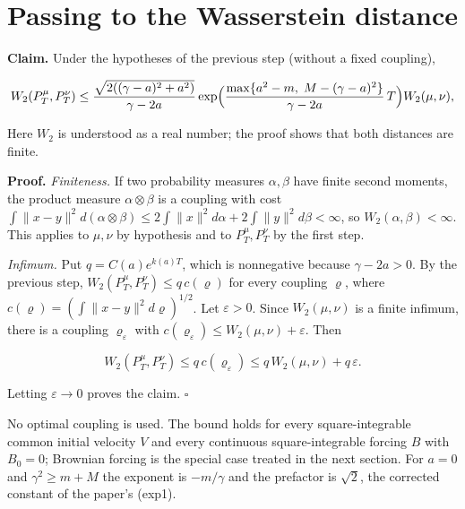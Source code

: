 \documentclass[11pt,a4paper]{article}
\begin{document}
\section{\texorpdfstring{Passing to the Wasserstein distance}{Passing to the Wasserstein distance}}


\textbf{Claim.} Under the hypotheses of the previous step (without a fixed coupling),


\[W_2(P^\mu_T,P^\nu_T)\le\frac{\sqrt{2((\gamma-a)^2+a^2)}}{\gamma-2a}\exp\Bigl(\frac{\max\{a^2-m,\;M-(\gamma-a)^2\}}{\gamma-2a}\,T\Bigr)W_2(\mu,\nu),\]


Here \(W_2\) is understood as a real number; the proof shows that both distances are finite.




\textbf{Proof.} \emph{Finiteness.} If two probability measures \(\alpha,\beta\) have finite second moments, the product measure \(\alpha\otimes\beta\) is a coupling with cost \(\int\|x-y\|^2d(\alpha\otimes\beta)\le2\int\|x\|^2d\alpha+2\int\|y\|^2d\beta<\infty\), so \(W_2(\alpha,\beta)<\infty\). This applies to \(\mu,\nu\) by hypothesis and to \(P^\mu_T,P^\nu_T\) by the first step.




\emph{Infimum.} Put \(q=C(a)e^{k(a)T}\), which is nonnegative because \(\gamma-2a>0\). By the previous step, \(W_2(P^\mu_T,P^\nu_T)\le q\,c(\varrho)\) for every coupling \(\varrho\), where \(c(\varrho)=(\int\|x-y\|^2d\varrho)^{1/2}\). Let \(\varepsilon>0\). Since \(W_2(\mu,\nu)\) is a finite infimum, there is a coupling \(\varrho_\varepsilon\) with \(c(\varrho_\varepsilon)\le W_2(\mu,\nu)+\varepsilon\). Then


\[W_2(P^\mu_T,P^\nu_T)\le q\,c(\varrho_\varepsilon)\le q\,W_2(\mu,\nu)+q\,\varepsilon.\]


Letting \(\varepsilon\to0\) proves the claim. \(\square\)




No optimal coupling is used. The bound holds for every square-integrable common initial velocity \(V\) and every continuous square-integrable forcing \(B\) with \(B_0=0\); Brownian forcing is the special case treated in the next section. For \(a=0\) and \(\gamma^2\ge m+M\) the exponent is \(-m/\gamma\) and the prefactor is \(\sqrt2\), the corrected constant of the paper's (exp1).
\end{document}
